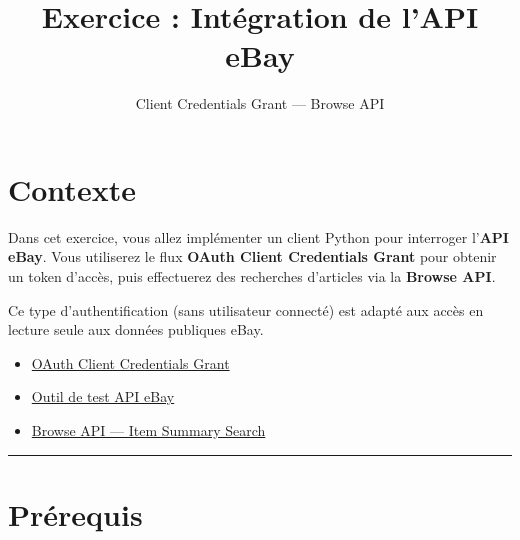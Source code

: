\documentclass[
  french,
  letterpaper,
  DIV=11,
  numbers=noendperiod]{scrartcl}
\title{Exercice : Intégration de l'API eBay}
\subtitle{Client Credentials Grant --- Browse API}
\author{}
\date{}
\providecommand{\tightlist}{%
  \setlength{\itemsep}{0pt}\setlength{\parskip}{0pt}}
\renewcommand*\contentsname{Table des matières}
\newcommand\contentsname{Table des matières}
\begin{document}
\maketitle

\renewcommand*\contentsname{Sommaire}
{
\hypersetup{linkcolor=}
\setcounter{tocdepth}{3}
\tableofcontents
}

\section{Contexte}\label{contexte}

Dans cet exercice, vous allez implémenter un client Python pour
interroger l'\textbf{API eBay}. Vous utiliserez le flux \textbf{OAuth
Client Credentials Grant} pour obtenir un token d'accès, puis
effectuerez des recherches d'articles via la \textbf{Browse API}.

Ce type d'authentification (sans utilisateur connecté) est adapté aux
accès en lecture seule aux données publiques eBay.

\begin{tcolorbox}[enhanced jigsaw, toptitle=1mm, arc=.35mm, colbacktitle=quarto-callout-note-color!10!white, title=\textcolor{quarto-callout-note-color}{\faInfo}\hspace{0.5em}{Ressources}, titlerule=0mm, toprule=.15mm, rightrule=.15mm, leftrule=.75mm, breakable, left=2mm, opacityback=0, coltitle=black, bottomrule=.15mm, colframe=quarto-callout-note-color-frame, bottomtitle=1mm, colback=white, opacitybacktitle=0.6]

\begin{itemize}
\tightlist
\item
  \href{https://developer.ebay.com/api-docs/static/oauth-client-credentials-grant.html}{OAuth
  Client Credentials Grant}
\item
  \href{https://developer.ebay.com/my/api_test_tool?index=0&env=production}{Outil
  de test API eBay}
\item
  \href{https://developer.ebay.com/api-docs/buy/browse/resources/item_summary/methods/search}{Browse
  API --- Item Summary Search}
\end{itemize}

\end{tcolorbox}

\begin{center}\rule{0.5\linewidth}{0.5pt}\end{center}

\section{Prérequis}\label{pruxe9requis}
\end{document}

